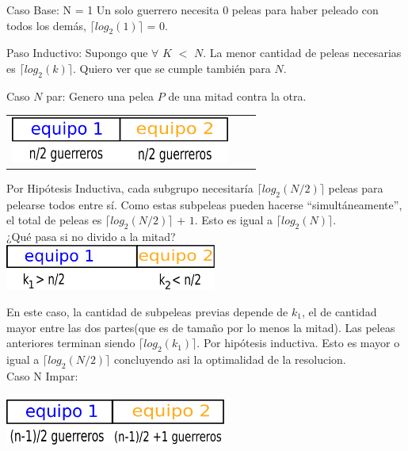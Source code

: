         Caso Base: N = 1
        Un solo guerrero necesita $0$ peleas para haber peleado con todos los demás, $\lceil log_{2}(1) \rceil$ = $0$.

        Paso Inductivo: Supongo que $\forall$ $K$ $<$ $N$. La menor cantidad de peleas necesarias es $\lceil log_{2}(k) \rceil$. Quiero ver que se cumple también para $N$.

        Caso $N$ par:
        Genero una pelea $P$ de una mitad contra la otra. 

        {\begin{tabular}{ccc}
         \includegraphics[height=1.5cm]{graficos/kaioken1.png} 

          \end{tabular}}

        Por Hipótesis Inductiva, cada subgrupo necesitaría $\lceil log_{2}(N/2) \rceil$ peleas para pelearse todos entre sí. Como estas subpeleas pueden hacerse “simultáneamente”, el total de peleas es $\lceil log_{2}(N/2) \rceil$ $+$ $1$. Esto es igual a $\lceil log_{2}(N) \rceil$. \\

        ¿Qué pasa si no divido a la mitad?\\


         \includegraphics[height=1.5cm]{graficos/kaioken2.png} 
        
        

        En este caso, la cantidad de subpeleas previas depende de $k_{1}$, el de cantidad mayor entre las dos partes(que es de tamaño por lo menos la mitad). Las peleas anteriores terminan siendo $\lceil log_{2}(k_{1}) \rceil$. Por hipótesis inductiva. Esto es mayor o igual a $\lceil log_{2}(N/2) \rceil$ concluyendo asi la optimalidad de la resolucion. \\

        Caso N Impar: \\
        \\

         \includegraphics[height=1.5cm]{graficos/kaioken3.png} 
        
